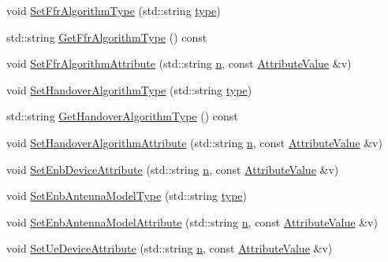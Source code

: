 \begin{DoxyCompactItemize}
\item 
void \hyperlink{classns3_1_1LteHelper_a035c6b03305c1511975362f80425b5fc}{Set\+Ffr\+Algorithm\+Type} (std\+::string \hyperlink{visualizer-ideas_8txt_add98db9e15e2a58cf2b57623e7aa893a}{type})
\item 
std\+::string \hyperlink{classns3_1_1LteHelper_a4512795e75ecff30e9eeca0d26589614}{Get\+Ffr\+Algorithm\+Type} () const 
\item 
void \hyperlink{classns3_1_1LteHelper_a793d56e843a844428851e90752c5f130}{Set\+Ffr\+Algorithm\+Attribute} (std\+::string \hyperlink{lte__link__budget__x2__handover__measures_8m_abdb05bc5a064cf642a06c83b3392f148}{n}, const \hyperlink{classns3_1_1AttributeValue}{Attribute\+Value} \&v)
\item 
void \hyperlink{classns3_1_1LteHelper_a6301630b8a7082043efff2a7aaaa1d20}{Set\+Handover\+Algorithm\+Type} (std\+::string \hyperlink{visualizer-ideas_8txt_add98db9e15e2a58cf2b57623e7aa893a}{type})
\item 
std\+::string \hyperlink{classns3_1_1LteHelper_a36c21827cb5935020858e0c0f6db4472}{Get\+Handover\+Algorithm\+Type} () const 
\item 
void \hyperlink{classns3_1_1LteHelper_a4da448bb1d3d13534cc54f6b7d33f26a}{Set\+Handover\+Algorithm\+Attribute} (std\+::string \hyperlink{lte__link__budget__x2__handover__measures_8m_abdb05bc5a064cf642a06c83b3392f148}{n}, const \hyperlink{classns3_1_1AttributeValue}{Attribute\+Value} \&v)
\item 
void \hyperlink{classns3_1_1LteHelper_ac42f0f3d6cd8473d810bfbbeb5d592e0}{Set\+Enb\+Device\+Attribute} (std\+::string \hyperlink{lte__link__budget__x2__handover__measures_8m_abdb05bc5a064cf642a06c83b3392f148}{n}, const \hyperlink{classns3_1_1AttributeValue}{Attribute\+Value} \&v)
\item 
void \hyperlink{classns3_1_1LteHelper_a758494fc0edaeaf7f311c6aa1c0b42d9}{Set\+Enb\+Antenna\+Model\+Type} (std\+::string \hyperlink{visualizer-ideas_8txt_add98db9e15e2a58cf2b57623e7aa893a}{type})
\item 
void \hyperlink{classns3_1_1LteHelper_ac0c1bc4eddaf7f8711f282cb681f99c5}{Set\+Enb\+Antenna\+Model\+Attribute} (std\+::string \hyperlink{lte__link__budget__x2__handover__measures_8m_abdb05bc5a064cf642a06c83b3392f148}{n}, const \hyperlink{classns3_1_1AttributeValue}{Attribute\+Value} \&v)
\item 
void \hyperlink{classns3_1_1LteHelper_ae85f256c4356b977d60a877dbbea1857}{Set\+Ue\+Device\+Attribute} (std\+::string \hyperlink{lte__link__budget__x2__handover__measures_8m_abdb05bc5a064cf642a06c83b3392f148}{n}, const \hyperlink{classns3_1_1AttributeValue}{Attribute\+Value} \&v)

\end{DoxyCompactItemize}
